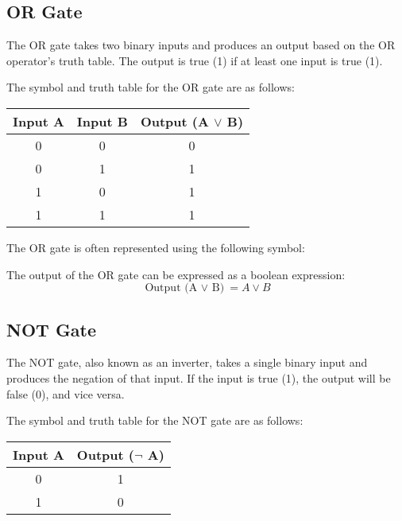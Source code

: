 \documentclass{article}
\begin{document}
\subsection{OR Gate}

The OR gate takes two binary inputs and produces an output based on the OR operator's truth table. The output is true (1) if at least one input is true (1).

The symbol and truth table for the OR gate are as follows:

\begin{center}
  \begin{tabular}{|c|c|c|}
    \hline
    \textbf{Input A} & \textbf{Input B} & \textbf{Output (A $\lor$ B)} \\
    \hline
    0 & 0 & 0 \\
    0 & 1 & 1 \\
    1 & 0 & 1 \\
    1 & 1 & 1 \\
    \hline
  \end{tabular}
\end{center}

The OR gate is often represented using the following symbol:

\begin{center}
\end{center}

The output of the OR gate can be expressed as a boolean expression:
\[ \text{Output (A $\lor$ B)} = A \lor B \]

\subsection{NOT Gate}

The NOT gate, also known as an inverter, takes a single binary input and produces the negation of that input. If the input is true (1), the output will be false (0), and vice versa.

The symbol and truth table for the NOT gate are as follows:

\begin{center}
  \begin{tabular}{|c|c|}
    \hline
    \textbf{Input A} & \textbf{Output ($\lnot$ A)} \\
    \hline
    0 & 1 \\
    1 & 0 \\
    \hline
  \end{tabular}
\end{center}
\end{document}
